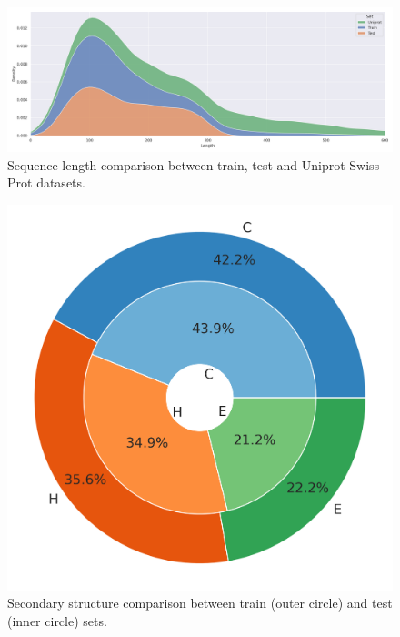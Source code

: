 \documentclass[nocrop]{bioinfo}
\begin{document}
\begin{figure}[!tb]
	\includegraphics[width=\textwidth]{sequence_length.png}
	\caption{Sequence length comparison between train, test and Uniprot Swiss-Prot datasets.}\label{fig:seq_length}
\end{figure}
\begin{figure}[!tb]
	\includegraphics[width=\columnwidth]{secondary.png}
	\caption{Secondary structure comparison between train (outer circle) and test (inner circle) sets.}\label{fig:ss_perc}
\end{figure}
\end{document}
